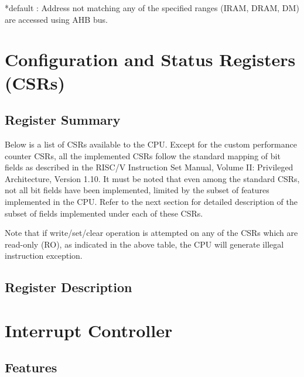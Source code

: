 \documentclass[main\_\_EN.tex]{subfiles}
\begin{document}
*default : Address not matching any of the specified ranges (IRAM, DRAM, DM) are accessed using AHB bus.



\section{Configuration and Status Registers (CSRs)}
\hypertarget{riscvcpu-cpu-reg-summ}{}
\subsection{Register Summary}
\label{sec:riscvcpu-cpu-reg-summ}


Below is a list of CSRs available to the CPU. Except for the custom performance counter CSRs, all the implemented CSRs follow the standard mapping of bit fields as described in the RISC\-/V Instruction Set Manual, Volume II: Privileged Architecture, Version 1.10. It must be noted that even among the standard CSRs, not all bit fields have been implemented, limited by the subset of features implemented in the CPU. Refer to the next section for detailed description of the subset of fields implemented under each of these CSRs.



Note that if write/set/clear operation is attempted on any of the CSRs which are read-only (RO), as indicated in the above table, the CPU will generate illegal instruction exception.

\subsection{Register Description}




\clearpage
\section{Interrupt Controller}
\label{sec:riscvcpu-int-ctrl}

\subsection{Features}
\label{sec:riscvcpu-int-features}
\end{document}
